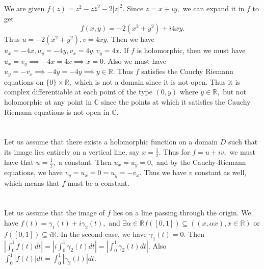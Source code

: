 \documentclass{article}
\title{} %
\author{Gandhar Kulkarni (mmat2304)} %
\date{} %
\begin{document}
\maketitle %


\section{} %
We are given $f(z)=z^2-z\bar{z}^2-2|z|^2.$ Since $z=x+iy,$ we can expand it in $f$ to get 
$$f(x,y)=-2(x^2+y^2)+i4xy.$$ Thus $u=-2(x^2+y^2),v=4xy.$ Then we have $u_x=-4x,u_y=-4y,v_x=4y,v_y=4x.$
If $f$ is holomorphic, then we must have $u_x=v_y \implies -4x=4x \implies x=0.$ Also we must have $u_y=-v_x \implies -4y=-4y \implies y \in \mathbb{R}.$
Thus $f$ satisfies the Cauchy Riemann equations on $\{0\} \times \mathbb{R},$ which is not a domain since it is not open. Thus it is complex differentiable 
at each point of the type $(0,y)$ where $y \in \mathbb{R},$ but not holomorphic at any point in $\mathbb{C}$ since the points at which it satisfies the 
Cauchy Riemann equations is not open in $\mathbb{C}.$ 
\section{} %
Let us assume that there exists a holomorphic function on a domain $D$ such that its image lies entirely on a vertical line, say $x=\frac{1}{2}$.
Thus for $f=u+iv,$ we must have that $u=\frac{1}{2},$ a constant. Then $u_x=u_y=0,$ and by the Cauchy-Riemann equations, we have $v_y=u_x=0=u_y=-v_x.$ Thus 
we have $v$ constant as well, which means that $f$ must be a constant.  
\section{} %

\section{} %
Let us assume that the image of $f$ lies on a line passing through the origin. We have $f(t)=\gamma_1(t)+i\gamma_2(t),$ and $\exists \alpha \in \mathbb{R} 
f([0,1])\subseteq ((x,\alpha x), x \in \mathbb{R})$ or $f([0,1]) \subseteq i\mathbb{R}.$ In the second case, we have $\gamma_1(t)=0.$ Then 
$|\int_{0}^1f(t)dt| = |i\int_{0}^1\gamma_2(t)dt| = |\int_{0}^1\gamma_2(t)dt|.$ Also $\int_{0}^1 |f(t)|dt= \int_{0}^1 |\gamma_2(t)|dt.$
\end{document}
